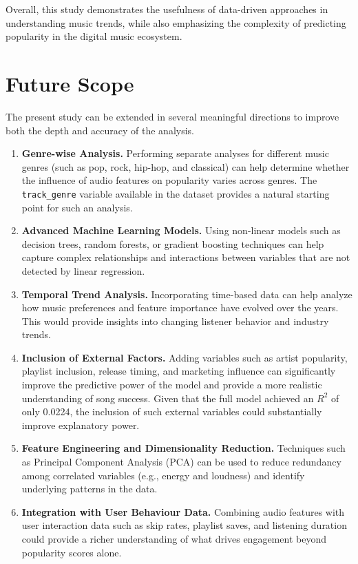\documentclass[12pt,a4paper]{article}
\begin{document}
Overall, this study demonstrates the usefulness of data-driven
approaches in understanding music trends, while also emphasizing
the complexity of predicting popularity in the digital music
ecosystem.

\section{Future Scope}
\label{sec:future}

The present study can be extended in several meaningful directions to
improve both the depth and accuracy of the analysis.

\begin{enumerate}

  \item \textbf{Genre-wise Analysis.}  
  Performing separate analyses for different music genres (such as pop,
  rock, hip-hop, and classical) can help determine whether the influence
  of audio features on popularity varies across genres. The \texttt{track\_genre} variable available in the dataset 
provides a natural starting point for such an analysis.

  \item \textbf{Advanced Machine Learning Models.}  
  Using non-linear models such as decision trees, random forests, or
  gradient boosting techniques can help capture complex relationships
  and interactions between variables that are not detected by linear
  regression.

  \item \textbf{Temporal Trend Analysis.}  
  Incorporating time-based data can help analyze how music preferences
  and feature importance have evolved over the years. This would provide
  insights into changing listener behavior and industry trends.

  \item \textbf{Inclusion of External Factors.}  
  Adding variables such as artist popularity, playlist inclusion,
  release timing, and marketing influence can significantly improve
  the predictive power of the model and provide a more realistic
  understanding of song success. Given that the full model achieved an $R^2$ of only 0.0224, 
the inclusion of such external variables could substantially 
improve explanatory power.

  \item \textbf{Feature Engineering and Dimensionality Reduction.}  
  Techniques such as Principal Component Analysis (PCA) can be used to
  reduce redundancy among correlated variables (e.g., energy and
  loudness) and identify underlying patterns in the data.
\item \textbf{Integration with User Behaviour Data.}
        Combining audio features with user interaction data such as
        skip rates, playlist saves, and listening duration could
        provide a richer understanding of what drives engagement
        beyond popularity scores alone.
\end{enumerate}
\end{document}
